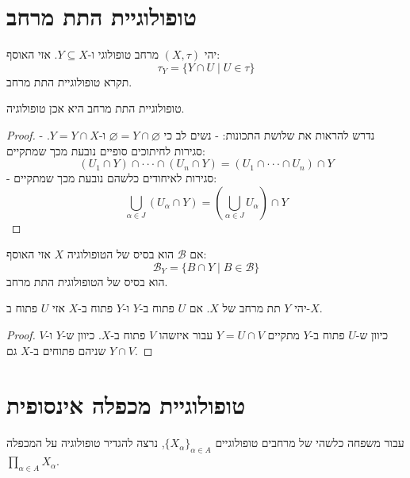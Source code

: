 \documentclass{tstextbook}
\begin{document}
\section{טופולוגיית התת מרחב}

\begin{definition}
יהי \((X,\tau)\) מרחב טופולוגי ו-\(Y\subseteq X\). אזי האוסף:
$$\tau_{Y}=\{ Y\cap  U\mid U \in \tau \}$$
תקרא טופולוגיית התת מרחב.

\end{definition}
\begin{lemma}
טופולוגיית התת מרחב היא אכן טופולוגיה.

\end{lemma}
\begin{proof}
נדרש להראות את שלושת התכונות:
- נשים לב כי \(\varnothing=Y\cap \varnothing\) ו-\(Y=Y\cap X\).
- סגירות לחיתוכים סופיים נובעת מכך שמתקיים:
$$(U_{1}\cap Y)\cap\cdot\cdot\cdot\cap(U_{n}\cap Y)=(U_{1}\cap\cdot\cdot\cdot\cap U_{n})\cap Y$$
- סגירות לאיחודים כלשהם נובעת מכך שמתקיים:
$$\bigcup_{\alpha\in J}(U_{\alpha}\cap Y)=(\bigcup_{\alpha\in J}U_{\alpha})\cap Y$$

\end{proof}
\begin{proposition}
אם \(\mathcal{B}\) הוא בסיס של הטופולוגיה \(X\) אזי האוסף:
$$\mathcal{B} _{Y}=\{ B\cap  Y \mid B \in \mathcal{B}  \}$$
הוא בסיס של הטופולוגית התת מרחב.

\end{proposition}
\begin{proposition}
יהי \(Y\) תת מרחב של \(X\). אם \(U\) פתוח ב-\(Y\) ו-\(Y\) פתוח ב-\(X\) אזי \(U\) פתוח ב-\(X\).

\end{proposition}
\begin{proof}
כיוון ש-\(U\) פתוח ב-\(Y\) מתקיים \(Y=U\cap V\) עבור איזשהו \(V\) פתוח ב-\(X\). כיוון ש-\(Y\) ו-\(V\) שניהם פתוחים ב-\(X\) גם \(Y \cap V\).

\end{proof}
\section{טופולוגיית מכפלה אינסופית}

עבור משפחה כלשהי של מרחבים טופולוגיים \(\{X_\alpha\}_{\alpha\in A}\), נרצה להגדיר טופולוגיה על המכפלה \(\prod_{\alpha\in A} X_\alpha\).
\end{document}
